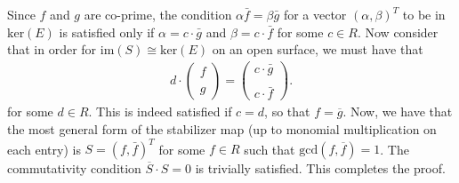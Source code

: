 \documentclass[aps,twocolumn,preprintnumbers,floatfix,showpacs,prx]{revtex4-1}
\begin{document}
Since $f$ and $g$ are co-prime, the condition $\alpha\bar{f} = \beta\bar{g}$ for a vector $(\alpha, \beta)^{T}$ to be in $\mathrm{ker}(E)$ is satisfied only if $\alpha = c\cdot \bar{g}$ and $\beta = c\cdot \bar{f}$ for some $c\in R$.  Now consider that in order for $\mathrm{im}(S)\cong\mathrm{ker}(E)$ on an open surface, we must have that
\begin{align}
d\cdot\left(\begin{array}{c} f\\\\g \end{array} \right) = \left(\begin{array}{c}c \cdot \bar{g}\\\\c\cdot \bar{f}\end{array}\right).
\end{align}
for some $d\in R$. This is indeed satisfied if $c = d$, so that $f = \overline{g}$.  Now, we have that the most general form of the stabilizer map (up to monomial multiplication on each entry) is $S = (f, \bar{f})^{T}$ for some $f \in R$ such that $\mathrm{gcd}(f,\overline{f}) = 1$. The commutativity condition $\overline{S}\cdot S = 0$ is trivially satisfied.  This completes the proof.


\end{document}
